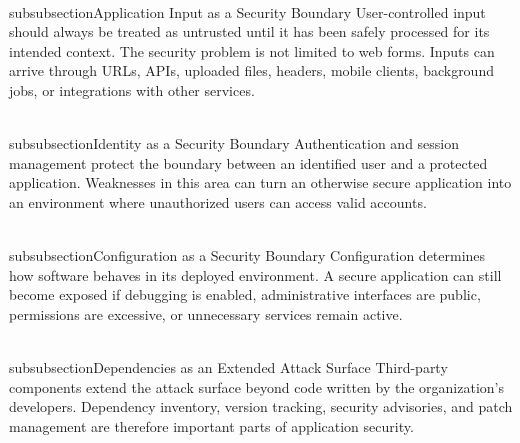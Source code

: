 \documentclass[11pt,a4paper]{article}
\begin{document}
\\subsubsection{Application Input as a Security Boundary}
User-controlled input should always be treated as untrusted until it has been safely processed for its intended context. The security problem is not limited to web forms. Inputs can arrive through URLs, APIs, uploaded files, headers, mobile clients, background jobs, or integrations with other services.

\\subsubsection{Identity as a Security Boundary}
Authentication and session management protect the boundary between an identified user and a protected application. Weaknesses in this area can turn an otherwise secure application into an environment where unauthorized users can access valid accounts.

\\subsubsection{Configuration as a Security Boundary}
Configuration determines how software behaves in its deployed environment. A secure application can still become exposed if debugging is enabled, administrative interfaces are public, permissions are excessive, or unnecessary services remain active.

\\subsubsection{Dependencies as an Extended Attack Surface}
Third-party components extend the attack surface beyond code written by the organization's developers. Dependency inventory, version tracking, security advisories, and patch management are therefore important parts of application security.
\end{document}
